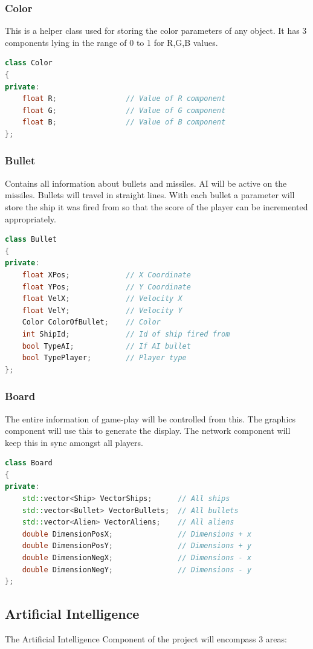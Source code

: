 \documentclass{article}
\begin{document}
				\subsubsection{Color}
					This is a helper class used for storing the color parameters of any object. It has 3 components lying in the range of 0 to 1 for R,G,B values.
					\begin{lstlisting}[language=C++, caption={Class Parameters for Color}]
class Color
{
private:
	float R;				// Value of R component
	float G;				// Value of G component
	float B;				// Value of B component
};
					\end{lstlisting}
				\subsubsection{Bullet}
					Contains all information about bullets and missiles. AI will be active on the missiles. Bullets will travel in straight lines. With each bullet a parameter will store the ship it was fired from so that the score of the player can be incremented appropriately.
					\begin{lstlisting}[language=C++, caption={Class Parameters for Bullet}]
class Bullet
{
private:
	float XPos;				// X Coordinate
	float YPos;				// Y Coordinate
	float VelX;				// Velocity X
	float VelY;				// Velocity Y
	Color ColorOfBullet;	// Color
	int ShipId;				// Id of ship fired from
	bool TypeAI;			// If AI bullet
	bool TypePlayer;		// Player type
};
					\end{lstlisting}
				\subsubsection{Board}
					The entire information of game-play will be controlled from this. The graphics component will use this to generate the display. The network component will keep this in sync amongst all players.
					\begin{lstlisting}[language=C++, caption={Class Parameters for Board}]
class Board
{
private:
	std::vector<Ship> VectorShips;		// All ships
	std::vector<Bullet> VectorBullets;	// All bullets
	std::vector<Alien> VectorAliens;	// All aliens
	double DimensionPosX;				// Dimensions + x	
	double DimensionPosY;				// Dimensions + y	
	double DimensionNegX;				// Dimensions - x	
	double DimensionNegY;				// Dimensions - y		
};
					\end{lstlisting}
			\subsection{Artificial Intelligence}
				The Artificial Intelligence Component of the project will encompass 3 areas:
\end{document}
